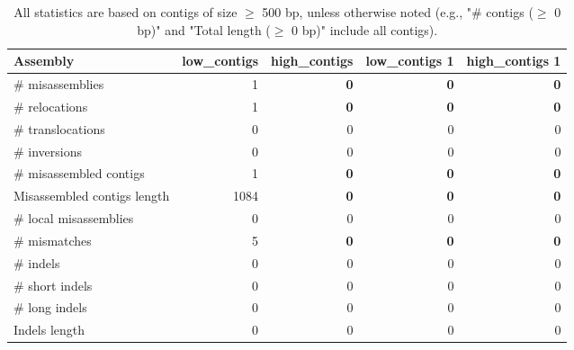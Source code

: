\documentclass[12pt,a4paper]{article}
\begin{document}
\begin{table}[ht]
\begin{center}
\caption{All statistics are based on contigs of size $\geq$ 500 bp, unless otherwise noted (e.g., "\# contigs ($\geq$ 0 bp)" and "Total length ($\geq$ 0 bp)" include all contigs).}
\begin{tabular}{|l*{4}{|r}|}
\hline
Assembly & low\_contigs & high\_contigs & low\_contigs 1 & high\_contigs 1 \\ \hline
\# misassemblies & 1 & {\bf 0} & {\bf 0} & {\bf 0} \\ \hline
\hspace{5mm}\# relocations & 1 & {\bf 0} & {\bf 0} & {\bf 0} \\ \hline
\hspace{5mm}\# translocations & 0 & 0 & 0 & 0 \\ \hline
\hspace{5mm}\# inversions & 0 & 0 & 0 & 0 \\ \hline
\# misassembled contigs & 1 & {\bf 0} & {\bf 0} & {\bf 0} \\ \hline
Misassembled contigs length & 1084 & {\bf 0} & {\bf 0} & {\bf 0} \\ \hline
\# local misassemblies & 0 & 0 & 0 & 0 \\ \hline
\# mismatches & 5 & {\bf 0} & {\bf 0} & {\bf 0} \\ \hline
\# indels & 0 & 0 & 0 & 0 \\ \hline
\hspace{5mm}\# short indels & 0 & 0 & 0 & 0 \\ \hline
\hspace{5mm}\# long indels & 0 & 0 & 0 & 0 \\ \hline
Indels length & 0 & 0 & 0 & 0 \\ \hline
\end{tabular}
\end{center}
\end{table}
\end{document}
